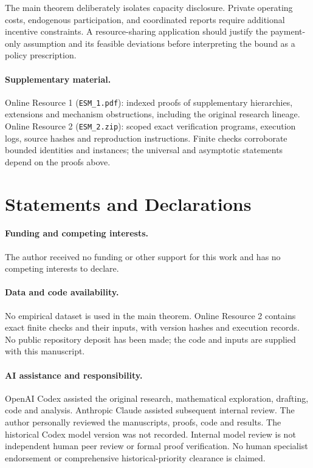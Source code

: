 \documentclass[11pt]{article}
\theoremstyle{definition}\newtheorem{definition}[theorem]{Definition}
\theoremstyle{remark}\newtheorem{remark}[theorem]{Remark}
\begin{document}
The main theorem deliberately isolates capacity disclosure. Private operating
costs, endogenous participation, and coordinated reports require additional
incentive constraints. A resource-sharing application should justify the
payment-only assumption and its feasible deviations before interpreting the
bound as a policy prescription.

\paragraph{Supplementary material.}
Online Resource 1 (\texttt{ESM\_1.pdf}): indexed proofs of supplementary
hierarchies, extensions and mechanism obstructions, including the original
research lineage. Online Resource 2 (\texttt{ESM\_2.zip}): scoped exact
verification programs, execution logs, source hashes and reproduction
instructions. Finite checks corroborate bounded identities and instances;
the universal and asymptotic statements depend on the proofs above.

\section*{Statements and Declarations}
\paragraph{Funding and competing interests.}
The author received no funding or other support for this work and has no
competing interests to declare.
\paragraph{Data and code availability.}
No empirical dataset is used in the main theorem. Online Resource 2 contains exact finite checks and their inputs, with
version hashes and execution records. No public repository deposit has been
made; the code and inputs are supplied with this manuscript.
\paragraph{AI assistance and responsibility.}
OpenAI Codex assisted the original research, mathematical exploration,
drafting, code and analysis. Anthropic Claude assisted subsequent internal
review. The author personally reviewed the manuscripts, proofs, code and
results. The historical Codex model version was not recorded. Internal model
review is not independent human peer review or formal proof verification.
No human specialist endorsement or comprehensive historical-priority
clearance is claimed.
\end{document}

